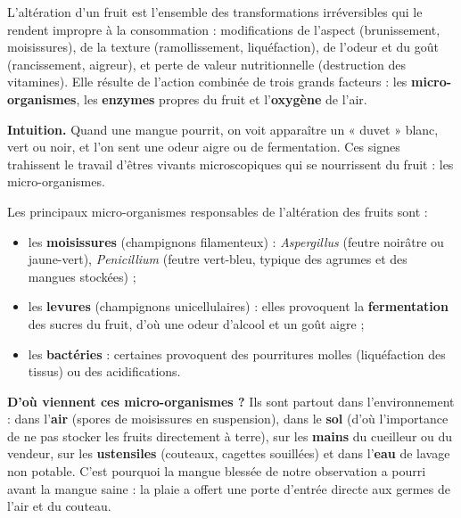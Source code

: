 \documentclass[11pt]{article}
\newcommand{\cle}[1]{{\popxbold\color{popdark}#1}}
\newcounter{popsec}
\newcounter{popsub}
\newcommand{\courssub}[1]{%
  \stepcounter{popsub}%
  \par\vspace{9pt}\noindent{\popxbold\fontsize{11.5}{13}\selectfont\color{popink}{\color{poporange}\thepopsec.\thepopsub}\hspace{6pt}#1}\par\nopagebreak\vspace{4pt}
}
\begin{document}
\begin{definition}
L'\cle{altération} d'un fruit est l'ensemble des transformations irréversibles qui le rendent impropre à la consommation : modifications de l'aspect (brunissement, moisissures), de la texture (ramollissement, liquéfaction), de l'odeur et du goût (rancissement, aigreur), et perte de valeur nutritionnelle (destruction des vitamines). Elle résulte de l'action combinée de trois grands facteurs : les \textbf{micro-organismes}, les \textbf{enzymes} propres du fruit et l'\textbf{oxygène} de l'air.
\end{definition}

\courssub{Facteur 1 : les micro-organismes}

\textbf{Intuition.} Quand une mangue pourrit, on voit apparaître un « duvet » blanc, vert ou noir, et l'on sent une odeur aigre ou de fermentation. Ces signes trahissent le travail d'êtres vivants microscopiques qui se nourrissent du fruit : les \cle{micro-organismes}.

\begin{definition}
Les principaux micro-organismes responsables de l'altération des fruits sont :
\begin{itemize}
\item les \textbf{moisissures} (champignons filamenteux) : \emph{Aspergillus} (feutre noirâtre ou jaune-vert), \emph{Penicillium} (feutre vert-bleu, typique des agrumes et des mangues stockées) ;
\item les \textbf{levures} (champignons unicellulaires) : elles provoquent la \textbf{fermentation} des sucres du fruit, d'où une odeur d'alcool et un goût aigre ;
\item les \textbf{bactéries} : certaines provoquent des pourritures molles (liquéfaction des tissus) ou des acidifications.
\end{itemize}
\end{definition}

\textbf{D'où viennent ces micro-organismes ?} Ils sont partout dans l'environnement : dans l'\textbf{air} (spores de moisissures en suspension), dans le \textbf{sol} (d'où l'importance de ne pas stocker les fruits directement à terre), sur les \textbf{mains} du cueilleur ou du vendeur, sur les \textbf{ustensiles} (couteaux, cagettes souillées) et dans l'\textbf{eau} de lavage non potable. C'est pourquoi la mangue blessée de notre observation a pourri avant la mangue saine : la plaie a offert une porte d'entrée directe aux germes de l'air et du couteau.
\end{document}
